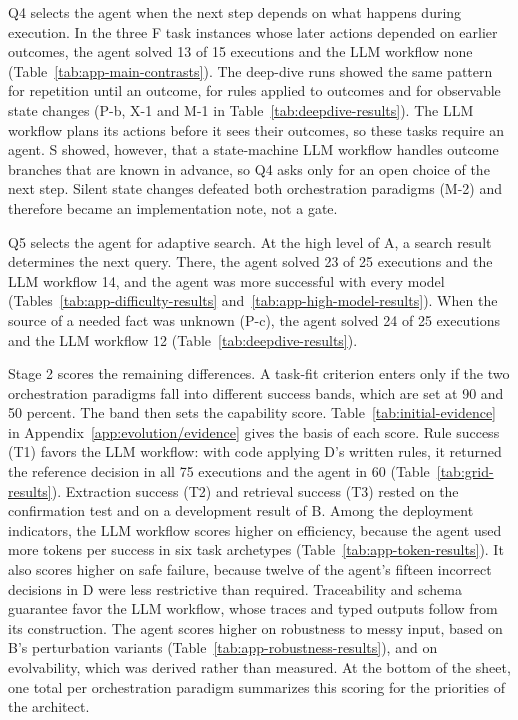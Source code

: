 Q4 selects the agent when the next step depends on what happens during execution. In the three F task instances whose later actions depended on earlier outcomes, the agent solved 13 of 15 executions and the LLM workflow none (Table~\ref{tab:app-main-contrasts}). The deep-dive runs showed the same pattern for repetition until an outcome, for rules applied to outcomes and for observable state changes (P-b, X-1 and M-1 in Table~\ref{tab:deepdive-results}). The LLM workflow plans its actions before it sees their outcomes, so these tasks require an agent. S showed, however, that a state-machine LLM workflow handles outcome branches that are known in advance, so Q4 asks only for an open choice of the next step. Silent state changes defeated both orchestration paradigms (M-2) and therefore became an implementation note, not a gate.

Q5 selects the agent for adaptive search. At the high level of A, a search result determines the next query. There, the agent solved 23 of 25 executions and the LLM workflow 14, and the agent was more successful with every model (Tables~\ref{tab:app-difficulty-results} and~\ref{tab:app-high-model-results}). When the source of a needed fact was unknown (P-c), the agent solved 24 of 25 executions and the LLM workflow 12 (Table~\ref{tab:deepdive-results}).

Stage 2 scores the remaining differences. A task-fit criterion enters only if the two orchestration paradigms fall into different success bands, which are set at 90 and 50 percent. The band then sets the capability score. Table~\ref{tab:initial-evidence} in Appendix~\ref{app:evolution/evidence} gives the basis of each score. Rule success (T1) favors the LLM workflow: with code applying D's written rules, it returned the reference decision in all 75 executions and the agent in 60 (Table~\ref{tab:grid-results}). Extraction success (T2) and retrieval success (T3) rested on the confirmation test and on a development result of B. Among the deployment indicators, the LLM workflow scores higher on efficiency, because the agent used more tokens per success in six task archetypes (Table~\ref{tab:app-token-results}). It also scores higher on safe failure, because twelve of the agent's fifteen incorrect decisions in D were less restrictive than required. Traceability and schema guarantee favor the LLM workflow, whose traces and typed outputs follow from its construction. The agent scores higher on robustness to messy input, based on B's perturbation variants (Table~\ref{tab:app-robustness-results}), and on evolvability, which was derived rather than measured. At the bottom of the sheet, one total per orchestration paradigm summarizes this scoring for the priorities of the architect.

